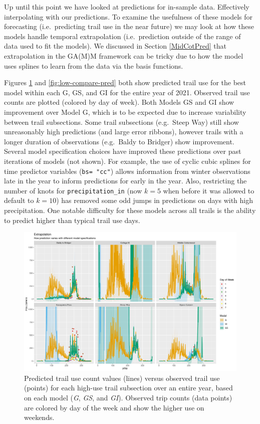 \documentclass[
]{book}
\begin{document}
Up until this point we have looked at predictions for in-sample data. Effectively interpolating with our predictions. To examine the usefulness of these models for forecasting (i.e.~predicting trail use in the near future) we may look at how these models handle temporal extrapolation (i.e.~prediction outside of the range of data used to fit the models). We discussed in Section \ref{MidCotPred} that extrapolation in the GA(M)M framework can be tricky due to how the model uses splines to learn from the data via the basis functions.

Figures \ref{fig:high-compare-pred} and \ref{fig:low-compare-pred} both show predicted trail use for the best model within each G, GS, and GI for the entire year of 2021. Observed trail use counts are plotted (colored by day of week). Both Models GS and GI show improvement over Model G, which is to be expected due to increase variability between trail subsections. Some trail subsections (e.g.~Steep Way) still show unreasonably high predictions (and large error ribbons), however trails with a longer duration of observations (e.g.~Baldy to Bridger) show improvement. Several model specification choices have improved these predictions over past iterations of models (not shown). For example, the use of cyclic cubic splines for time predictor variables (\texttt{bs=\ "cc"}) allows information from winter observations late in the year to inform predictions for early in the year. Also, restricting the number of knots for \texttt{precipitation\_in} (now \(k=5\) when before it was allowed to default to \(k=10\)) has removed some odd jumps in predictions on days with high precipitation. One notable difficulty for these models across all trails is the ability to predict higher than typical trail use days.

\begin{figure}

{\centering \includegraphics[width=1\linewidth]{../figures/high_pred_compare} 

}

\caption{Predicted trail use count values (lines) versus observed trail use (points) for each high-use trail subsection over an entire year, based on each model (\emph{G}, \emph{GS}, and \emph{GI}). Observed trip counts (data points) are colored by day of the week and show the higher use on weekends. }\label{fig:high-compare-pred}
\end{figure}
\end{document}
